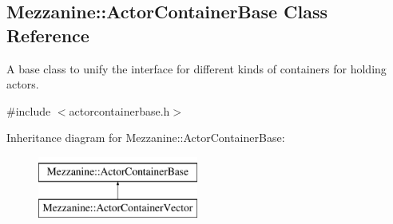 \hypertarget{classMezzanine_1_1ActorContainerBase}{
\subsection{Mezzanine::ActorContainerBase Class Reference}
\label{classMezzanine_1_1ActorContainerBase}
}


A base class to unify the interface for different kinds of containers for holding actors.  




{\ttfamily \#include $<$actorcontainerbase.h$>$}

Inheritance diagram for Mezzanine::ActorContainerBase:\begin{figure}[H]
\begin{center}
\leavevmode
\includegraphics[height=2.000000cm]{classMezzanine_1_1ActorContainerBase}
\end{center}
\end{figure}
